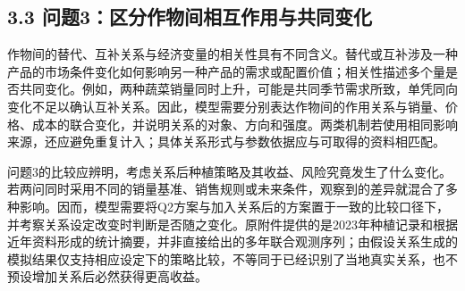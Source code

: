 \documentclass[11pt,a4paper]{article}
\begin{document}
\subsection*{3.3 问题3：区分作物间相互作用与共同变化}
作物间的替代、互补关系与经济变量的相关性具有不同含义。替代或互补涉及一种产品的市场条件变化如何影响另一种产品的需求或配置价值；相关性描述多个量是否共同变化。例如，两种蔬菜销量同时上升，可能是共同季节需求所致，单凭同向变化不足以确认互补关系。因此，模型需要分别表达作物间的作用关系与销量、价格、成本的联合变化，并说明关系的对象、方向和强度。两类机制若使用相同影响来源，还应避免重复计入；具体关系形式与参数依据应与可取得的资料相匹配。\par
问题3的比较应辨明，考虑关系后种植策略及其收益、风险究竟发生了什么变化。若两问同时采用不同的销量基准、销售规则或未来条件，观察到的差异就混合了多种影响。因而，模型需要将Q2方案与加入关系后的方案置于一致的比较口径下，并考察关系设定改变时判断是否随之变化。原附件提供的是2023年种植记录和根据近年资料形成的统计摘要，并非直接给出的多年联合观测序列；由假设关系生成的模拟结果仅支持相应设定下的策略比较，不等同于已经识别了当地真实关系，也不预设增加关系后必然获得更高收益。\par
\end{document}
